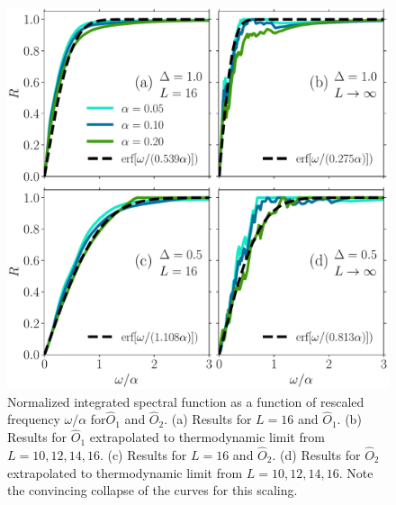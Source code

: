 \begin{figure}[ht]
  \centering
  \includegraphics[width=\figsize\textwidth]{Figures/O12_linear_scaling_small.pdf}
  \caption{Normalized integrated spectral function as a function of rescaled 
  frequency \(\omega/\alpha\) for\(\hat{O}_1\) and \(\hat{O}_2\).
  (a) Results for \(L=16\) and \(\hat{O}_1\).  (b) Results for \(\hat{O}_1\) extrapolated to
  thermodynamic limit from \(L=10,12,14,16\). (c) Results for \(L=16\) and \(\hat{O}_2\). 
  (d) Results for \(\hat{O}_2\) extrapolated to thermodynamic limit from \(L=10,12,14,16\).
  Note the convincing collapse of the curves for this scaling.}\label{fig:O12 linear scaling}
\end{figure}
